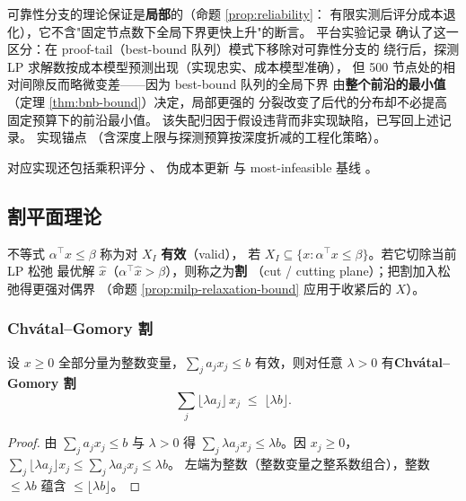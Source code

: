\begin{remark}
\label{rem:reliability-mismatch}
可靠性分支的理论保证是\textbf{局部}的（命题 \ref{prop:reliability}：
有限实测后评分成本退化），它不含"固定节点数下全局下界更快上升"的断言。
平台实验记录
确认了这一区分：在 proof-tail（best-bound 队列）模式下移除对可靠性分支的
绕行后，探测 LP 求解数按成本模型预测出现（实现忠实、成本模型准确），
但 500 节点处的相对间隙反而略微变差——因为 best-bound 队列的全局下界
由\textbf{整个前沿的最小值}（定理 \ref{thm:bnb-bound}）决定，局部更强的
分裂改变了后代的分布却不必提高固定预算下的前沿最小值。
该失配归因于假设违背而非实现缺陷，已写回上述记录。
实现锚点
（含深度上限与探测预算按深度折减的工程化策略）。
\end{remark}

对应实现还包括乘积评分
、
伪成本更新
与 most-infeasible 基线
。

\subsection{割平面理论}
\label{subsec:cuts}

\begin{definition}[有效不等式]
不等式 $\alpha^\top x \le \beta$ 称为对 $X_I$ \textbf{有效}（valid），
若 $X_I \subseteq \{x : \alpha^\top x \le \beta\}$。若它切除当前 LP 松弛
最优解 $\hat x$（$\alpha^\top \hat x > \beta$），则称之为\textbf{割}
（cut / cutting plane）；把割加入松弛得更强对偶界
（命题 \ref{prop:milp-relaxation-bound} 应用于收紧后的 $X$）。
\end{definition}

\subsubsection{Chv\'atal--Gomory 割}

\begin{lemma}[CG 舍入]
\label{lem:cg-rounding}
设 $x \ge 0$ 全部分量为整数变量，$\sum_j a_j x_j \le b$ 有效，则对任意
$\lambda > 0$ 有\textbf{Chv\'atal--Gomory 割}
\begin{equation}
\label{eq:cg-cut}
\sum_j \big\lfloor \lambda a_j \big\rfloor\, x_j \;\le\; \lfloor \lambda b \rfloor.
\end{equation}
\end{lemma}
\begin{proof}
由 $\sum_j a_j x_j \le b$ 与 $\lambda > 0$ 得
$\sum_j \lambda a_j x_j \le \lambda b$。因 $x_j \ge 0$，
$\sum_j \lfloor\lambda a_j\rfloor x_j \le \sum_j \lambda a_j x_j \le \lambda b$。
左端为整数（整数变量之整系数组合），整数 $\le \lambda b$ 蕴含
$\le \lfloor\lambda b\rfloor$。
\end{proof}

